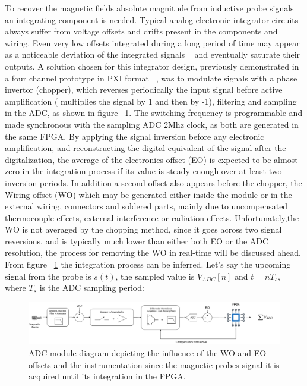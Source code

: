 To recover the magnetic fields absolute magnitude from inductive probe signals an integrating component is needed. Typical analog electronic integrator circuits always suffer from voltage offsets and drifts present in the components and wiring. Even very low offsets integrated during a long period of time may appear as a noticeable deviation of the integrated signals ~\cite{Spuig2003} and eventually saturate their outputs. A solution chosen for this integrator design, previously demonstrated in a four channel prototype in PXI format ~\cite{Werner2008}, was to modulate signals with a phase invertor (chopper), which reverses periodically the input signal before active amplification ( multiplies the signal by 1 and then by -1), filtering and sampling in the ADC, as shown in figure ~\ref{ADC_FPGA}. The switching frequency is programmable and made synchronous with the sampling ADC 2Mhz clock, as both are generated in the same FPGA. By applying the signal inversion before any electronic amplification, and reconstructing the digital equivalent of the signal after the digitalization, the average of the electronics offset (EO) is expected to be almost  zero in the integration process if its value is steady enough over at least two inversion periods. In addition a second offset also appears before the chopper, the Wiring offset (WO) which may be generated either inside the module or in the external wiring, connectors and soldered parts, mainly due to uncompensated thermocouple effects, external interference or radiation effects. Unfortunately,the WO is not averaged by the chopping method, since it goes across two signal reversions, and is typically much lower than either both EO or the ADC resolution, the process for removing the WO in real-time will be discussed ahead. From figure ~\ref{ADC_FPGA} the integration process can be inferred. Let's say the upcoming signal from the probe is $s(t)$, the sampled value is $V_{ADC}[n]$ and $t=nT_s$, where $T_s$ is the ADC sampling period:
\smallskip


\begin{figure}[htbp]
	\centering
	\includegraphics[width=1\textwidth]{Chp4/ADC_FPGA.png}
	\caption{\label{ADC_FPGA} ADC module diagram depicting the influence of the WO and EO offsets and the instrumentation since the magnetic probes signal it is acquired until its integration in the FPGA. }
\end{figure}

